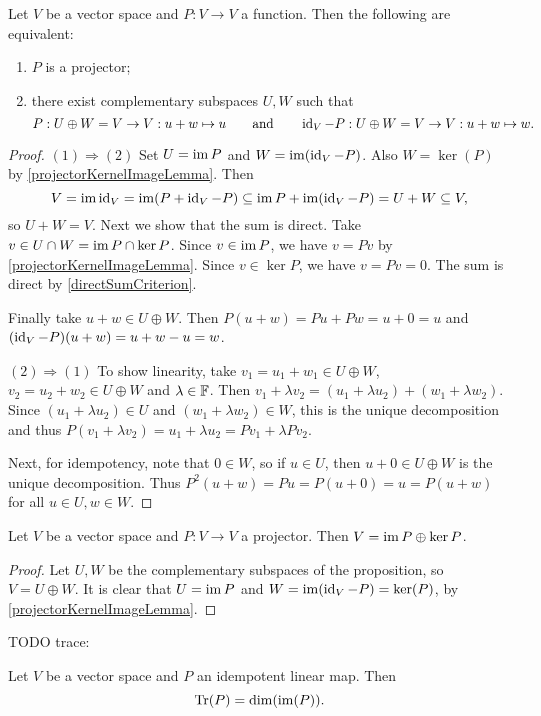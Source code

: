 \begin{proposition} \label{projectorComplementarySubspaces}
Let $V$ be a vector space and $P: V\to V$ a function. Then the following are equivalent:
\begin{enumerate}
\item $P$ is a projector;
\item there exist complementary subspaces $U,W$ such that
\[ P: U\oplus W = V \to V: u+w \mapsto u \qquad\text{and}\qquad \operatorname{id}_V - P: U\oplus W = V \to V: u+w \mapsto w. \]
\end{enumerate}
\end{proposition}
\begin{proof}
$(1) \Rightarrow (2)$ Set $U = \operatorname{im} P$ and $W = \operatorname{im}(\operatorname{id}_V - P)$. Also $W = \ker(P)$ by \ref{projectorKernelImageLemma}. Then
\[ V = \operatorname{im}\operatorname{id}_V = \operatorname{im}(P + \operatorname{id}_V - P) \subseteq \operatorname{im} P + \operatorname{im}(\operatorname{id}_V - P) = U + W \subseteq V, \]
so $U+W = V$. Next we show that the sum is direct. Take $v\in U \cap W = \operatorname{im} P \cap \ker P$. Since $v\in \operatorname{im} P$, we have $v= Pv$ by \ref{projectorKernelImageLemma}. Since $v\in \ker P$, we have $v= Pv = 0$. The sum is direct by \ref{directSumCriterion}.

Finally take $u+w\in U\oplus W$. Then $P(u+w) = Pu + Pw = u+0 = u$ and $(\operatorname{id}_V-P)(u+w) = u+w - u = w$.

$(2) \Rightarrow (1)$ To show linearity, take $v_1 = u_1 +w_1 \in U\oplus W$, $v_2 = u_2 +w_2 \in U\oplus W$ and $\lambda \in \mathbb{F}$. Then $v_1 + \lambda v_2 = (u_1 + \lambda u_2) + (w_1 + \lambda w_2)$. Since $(u_1 + \lambda u_2) \in U$ and $(w_1 + \lambda w_2) \in W$, this is the unique decomposition and thus $P(v_1 + \lambda v_2) = u_1 + \lambda u_2 = Pv_1 + \lambda Pv_2$.

Next, for idempotency, note that $0\in W$, so if $u\in U$, then $u+0\in U\oplus W$ is the unique decomposition. Thus $P^2(u+w) = Pu = P(u + 0) = u = P(u+w)$ for all $u\in U,w\in W$.
\end{proof}
\begin{corollary} \label{directSumKernelImageIdempotent}
Let $V$ be a vector space and $P: V\to V$ a projector. Then $V= \operatorname{im} P \oplus \ker P$.
\end{corollary}
\begin{proof}
Let $U,W$ be the complementary subspaces of the proposition, so $V = U\oplus W$. It is clear that $U = \operatorname{im} P$ and $W = \operatorname{im}(\operatorname{id}_V - P) = \ker(P)$, by \ref{projectorKernelImageLemma}.
\end{proof}


TODO trace:
\begin{lemma}
Let $V$ be a vector space and $P$ an idempotent linear map. Then
\[ \operatorname{Tr}(P) = \dim(\operatorname{im}(P)). \]
\end{lemma}


